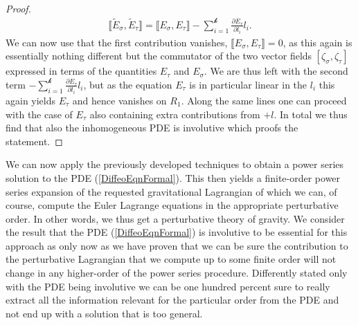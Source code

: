 \begin{proof}
\begin{align}
    \llbracket \tilde{E}_{\sigma}, \tilde{E}_{\tau} \rrbracket = \llbracket E_{\sigma}, E_{\tau} \rrbracket - \sum_{i=1}^{\mathcal{k}} \frac{\partial E_{\tau}}{\partial l_i} l_i.
\end{align}
We can now use that the first contribution vanishes, $\llbracket E_{\sigma}, E_{\tau} \rrbracket = 0$, as this again is essentially nothing different but the commutator of the two vector fields $[\zeta_{\sigma},\zeta_{\tau}]$ expressed in terms of the quantities $E_{\tau}$ and $E_{\sigma}$. We are thus left with the second term $- \sum_{i=1}^{\mathcal{k}} \frac{\partial E_{\tau}}{\partial l_i} l_i$, but as the equation $E_{\tau}$ is in particular linear in the $l_i$ this again yields $E_{\tau}$ and hence vanishes on $R_1$. Along the same lines one can proceed with the case of $E_{\tau}$ also containing extra contributions from $+l$. In total we thus find that also the inhomogeneous PDE is involutive which proofs the statement.
\end{proof}

We can now apply the previously developed techniques to obtain a power series solution to the PDE (\ref{DiffeoEqnFormal}). This then yields a finite-order power series expansion of the requested gravitational Lagrangian of which we can, of course, compute the Euler Lagrange equations in the appropriate perturbative order. In other words, we thus get a perturbative theory of gravity. We consider the result that the PDE (\ref{DiffeoEqnFormal}) is involutive to be essential for this approach as only now as we have proven that we can be sure the contribution to the perturbative Lagrangian that we compute up to some finite order will not change in any higher-order of the power series procedure. Differently stated only with the PDE being involutive we can be one hundred percent sure to really extract all the information relevant for the particular order from the PDE and not end up with a solution that is too general. 

